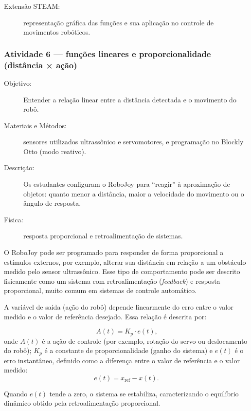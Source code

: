 \documentclass[portuguese]{textolivre}
\begin{document}
\begin{description}
    \item[Extensão STEAM:] representação gráfica das funções e sua aplicação no controle de movimentos robóticos.
\end{description}

\subsubsection{Atividade 6 — funções lineares e proporcionalidade (distância × ação)}

\begin{description}
    \item[Objetivo:] Entender a relação linear entre a distância detectada e o movimento do robô.
    \item[Materiais e Métodos:] sensores utilizados ultrassônico e servomotores, e programação no Blockly Otto (modo reativo).
    \item[Descrição:] Os estudantes configuram o RoboJoy para “reagir” à aproximação de objetos: quanto menor a distância, maior a velocidade do movimento ou o ângulo de resposta.
    \item[Física:] resposta proporcional e retroalimentação de sistemas.
\end{description}

O RoboJoy pode ser programado para responder de forma proporcional a estímulos externos, por exemplo, alterar sua distância em relação a um obstáculo medido pelo sensor ultrassônico. Esse tipo de comportamento pode ser descrito fisicamente como um sistema com retroalimentação (\textit{feedback}) e resposta proporcional, muito comum em sistemas de controle automático.

A variável de saída (ação do robô) depende linearmente do erro entre o valor medido e o valor de referência desejado. Essa relação é descrita por:

\begin{equation}
	A(t) = K_p \cdot e(t) \text{,}
\end{equation}
onde
$A(t)$ é a ação de controle (por exemplo, rotação do servo ou deslocamento do robô); 
$K_p$ é a constante de proporcionalidade (ganho do sistema) e
$e(t)$ é o erro instantâneo, definido como a diferença entre o valor de referência e o valor medido: 
\begin{equation}
	e(t) = x_{\text{ref}} - x(t) .
\end{equation}

Quando $e(t)$ tende a zero, o sistema se estabiliza, caracterizando o equilíbrio dinâmico obtido pela retroalimentação proporcional.
\end{document}
